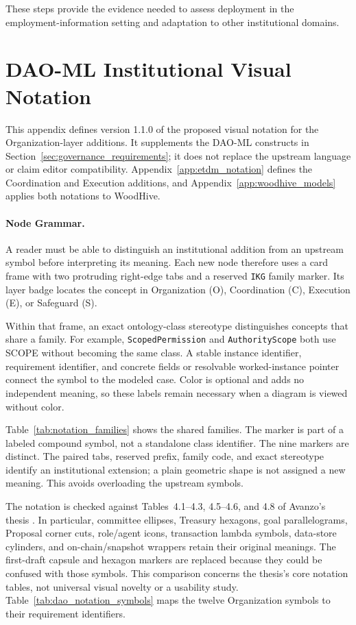 \documentclass[journal]{IEEEtran}
\begin{document}
These steps provide the evidence needed to assess deployment
in the employment-information setting and adaptation to
other institutional domains.


\clearpage
\appendices
\raggedbottom
\makeatletter
\setlength{\@fptop}{0pt}
\setlength{\@dblfptop}{0pt}
\makeatother
\section{DAO-ML Institutional Visual Notation}
\label{app:dao_ml_notation}

This appendix defines version 1.1.0 of the proposed visual
notation for the Organization-layer additions. It supplements the DAO-ML
constructs in Section~\ref{sec:governance_requirements}; it does
not replace the upstream language or claim editor compatibility.
Appendix~\ref{app:etdm_notation} defines the Coordination and
Execution additions, and Appendix~\ref{app:woodhive_models}
applies both notations to WoodHive.

\paragraph{Node Grammar.}
A reader must be able to distinguish an institutional addition from an
upstream symbol before interpreting its meaning. Each new node therefore
uses a card frame with two protruding right-edge tabs and a reserved
\texttt{IKG} family marker. Its layer badge locates the concept in
Organization (O), Coordination (C), Execution (E), or Safeguard (S).

Within that frame, an exact ontology-class stereotype distinguishes
concepts that share a family. For example, \texttt{ScopedPermission}
and \texttt{AuthorityScope} both use SCOPE without becoming the same class.
A stable instance identifier, requirement identifier, and concrete fields
or resolvable worked-instance pointer connect the symbol to the modeled
case. Color is optional and adds no independent meaning, so these labels
remain necessary when a diagram is viewed without color.

Table~\ref{tab:notation_families} shows the shared families.
The marker is part of a labeled compound symbol, not a standalone
class identifier. The nine markers are distinct. The paired tabs,
reserved prefix, family code, and exact stereotype identify an
institutional extension; a plain geometric shape is not assigned
a new meaning. This avoids overloading the upstream symbols.

The notation is checked against Tables~4.1--4.3, 4.5--4.6, and
4.8 of Avanzo's thesis \cite{Avanzo2025Thesis}. In particular,
committee ellipses, Treasury hexagons, goal parallelograms,
Proposal corner cuts, role/agent icons, transaction lambda
symbols, data-store cylinders, and on-chain/snapshot wrappers
retain their original meanings. The first-draft capsule and
hexagon markers are replaced because they could be confused
with those symbols. This comparison concerns the thesis's core
notation tables, not universal visual novelty or a usability study.
Table~\ref{tab:dao_notation_symbols} maps the twelve Organization
symbols to their requirement identifiers.
\end{document}
